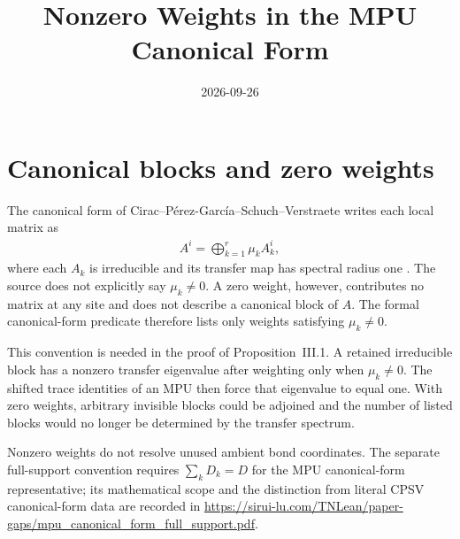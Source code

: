 \documentclass{article}
\title{Nonzero Weights in the MPU Canonical Form}
\author{}
\date{2026-09-26}
\begin{document}
\maketitle
{}

\section{Canonical blocks and zero weights}

The canonical form of Cirac--P\'erez-Garc\'ia--Schuch--Verstraete writes
each local matrix as
\begin{align}
  A^i = \bigoplus_{k=1}^{r}\mu_k A_k^i,
    \label{eq:mpu_canonical_form_nonzero_weights_1}
\end{align}
where each $A_k$ is irreducible and its transfer map has spectral radius one
\cite[canonical-form definition]{Cirac2017MPU}. The source does not explicitly
say $\mu_k\ne0$. A zero weight, however, contributes no matrix at any site and
does not describe a canonical block of $A$. The formal canonical-form
predicate therefore lists only weights satisfying $\mu_k\ne0$.

This convention is needed in the proof of Proposition~III.1. A retained
irreducible block has a nonzero transfer eigenvalue after weighting only when
$\mu_k\ne0$. The shifted trace identities of an MPU then force that
eigenvalue to equal one. With zero weights, arbitrary invisible blocks could be
adjoined and the number of listed blocks would no longer be determined by the
transfer spectrum.

Nonzero weights do not resolve unused ambient bond coordinates. The separate
full-support convention requires $\sum_k D_k=D$ for the MPU canonical-form
representative; its mathematical scope and the distinction from literal CPSV
canonical-form data are recorded in
\url{https://sirui-lu.com/TNLean/paper-gaps/mpu_canonical_form_full_support.pdf}.



\end{document}
